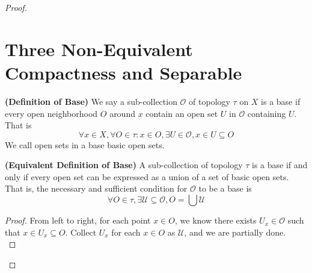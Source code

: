 \documentclass{report}
\begin{document}
\begin{proof}
\section{Three Non-Equivalent Compactness and Separable}
\begin{definition}
\label{2.6.1}
\textbf{(Definition of Base)} We say a sub-collection $\mathcal{O}$ of topology $\tau$ on $X$ is a base if every open neighborhood $O$ around $x$ contain an open set $U$ in $\mathcal{O}$ containing $U$. That is
\begin{equation*}
\forall x\in X, \forall O\in\tau:x\in O,\exists U\in \mathcal{O}, x\in U\subseteq O
\end{equation*}
We call open sets in a base basic open sets.
\end{definition}
\begin{theorem}
\label{2.6.2}
\textbf{(Equivalent Definition of Base)} A sub-collection of topology $\tau$ is a base if and only if every open set can be expressed as a union of a set of basic open sets. That is, the necessary and sufficient condition for $\mathcal{O}$ to be a base is 
\begin{equation*}
\forall O\in \tau, \exists \mathcal{U}\subseteq \mathcal{O}, O=\bigcup \mathcal{U}
\end{equation*}
\end{theorem}
\begin{proof}
  From left to right, for each point $x\in O$, we know there exists $U_x\in \mathcal{O}$ such that $x\in U_x\subseteq O$. Collect $U_x$ for each $x\in O$ as $\mathcal{U}$, and we are partially done.\\


\end{proof}
\end{proof}
\end{document}
